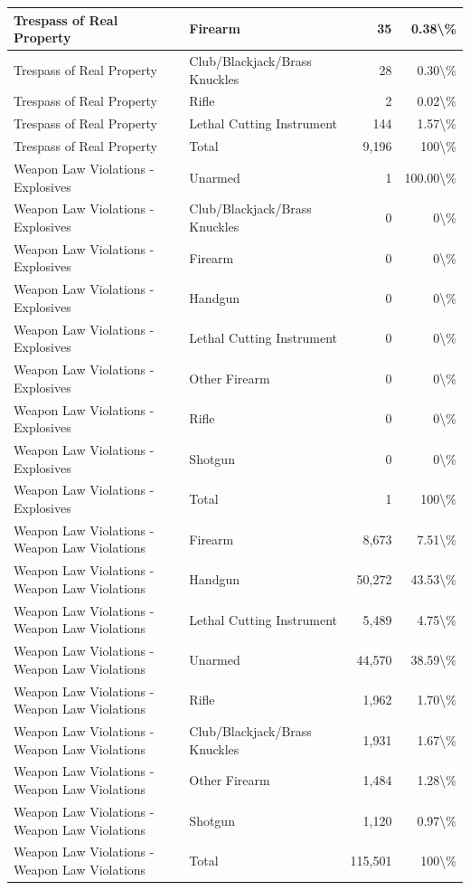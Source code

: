 \documentclass[
]{krantz}
\begin{document}
\begin{longtable}[t]{l|l|r|r}
\hline
Trespass of Real Property & Firearm & 35 & 0.38\textbackslash{}\%\\
\hline
Trespass of Real Property & Club/Blackjack/Brass Knuckles & 28 & 0.30\textbackslash{}\%\\
\hline
Trespass of Real Property & Rifle & 2 & 0.02\textbackslash{}\%\\
\hline
Trespass of Real Property & Lethal Cutting Instrument & 144 & 1.57\textbackslash{}\%\\
\hline
Trespass of Real Property & Total & 9,196 & 100\textbackslash{}\%\\
\hline
Weapon Law Violations - Explosives & Unarmed & 1 & 100.00\textbackslash{}\%\\
\hline
Weapon Law Violations - Explosives & Club/Blackjack/Brass Knuckles & 0 & 0\textbackslash{}\%\\
\hline
Weapon Law Violations - Explosives & Firearm & 0 & 0\textbackslash{}\%\\
\hline
Weapon Law Violations - Explosives & Handgun & 0 & 0\textbackslash{}\%\\
\hline
Weapon Law Violations - Explosives & Lethal Cutting Instrument & 0 & 0\textbackslash{}\%\\
\hline
Weapon Law Violations - Explosives & Other Firearm & 0 & 0\textbackslash{}\%\\
\hline
Weapon Law Violations - Explosives & Rifle & 0 & 0\textbackslash{}\%\\
\hline
Weapon Law Violations - Explosives & Shotgun & 0 & 0\textbackslash{}\%\\
\hline
Weapon Law Violations - Explosives & Total & 1 & 100\textbackslash{}\%\\
\hline
Weapon Law Violations - Weapon Law Violations & Firearm & 8,673 & 7.51\textbackslash{}\%\\
\hline
Weapon Law Violations - Weapon Law Violations & Handgun & 50,272 & 43.53\textbackslash{}\%\\
\hline
Weapon Law Violations - Weapon Law Violations & Lethal Cutting Instrument & 5,489 & 4.75\textbackslash{}\%\\
\hline
Weapon Law Violations - Weapon Law Violations & Unarmed & 44,570 & 38.59\textbackslash{}\%\\
\hline
Weapon Law Violations - Weapon Law Violations & Rifle & 1,962 & 1.70\textbackslash{}\%\\
\hline
Weapon Law Violations - Weapon Law Violations & Club/Blackjack/Brass Knuckles & 1,931 & 1.67\textbackslash{}\%\\
\hline
Weapon Law Violations - Weapon Law Violations & Other Firearm & 1,484 & 1.28\textbackslash{}\%\\
\hline
Weapon Law Violations - Weapon Law Violations & Shotgun & 1,120 & 0.97\textbackslash{}\%\\
\hline
Weapon Law Violations - Weapon Law Violations & Total & 115,501 & 100\textbackslash{}\%\\
\hline
\end{longtable}
\end{document}
